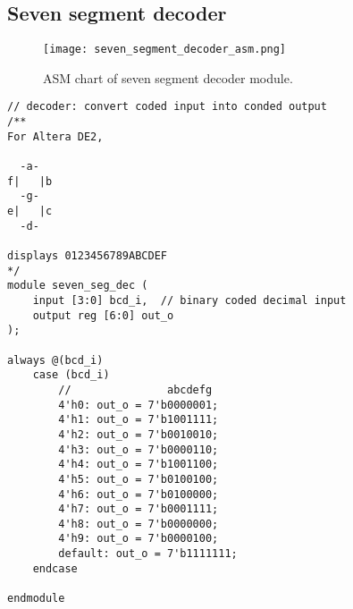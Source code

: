 \subsection{Seven segment decoder}

\begin{figure}[htbp]
   \centering
   \texttt{[image: seven\_segment\_decoder\_asm.png]}
   \caption{ASM chart of seven segment decoder module.}
   \label{fig:seven_segment_decoder_asm}
\end{figure}

\begin{verbatim}
// decoder: convert coded input into conded output
/**
For Altera DE2,

  -a-
f|   |b
  -g-
e|   |c
  -d-

displays 0123456789ABCDEF
*/
module seven_seg_dec (
	input [3:0] bcd_i,  // binary coded decimal input
	output reg [6:0] out_o
);

always @(bcd_i)
	case (bcd_i)
		//               abcdefg
		4'h0: out_o = 7'b0000001;
		4'h1: out_o = 7'b1001111;
		4'h2: out_o = 7'b0010010;
		4'h3: out_o = 7'b0000110;
		4'h4: out_o = 7'b1001100;
		4'h5: out_o = 7'b0100100;
		4'h6: out_o = 7'b0100000;
		4'h7: out_o = 7'b0001111;
		4'h8: out_o = 7'b0000000;
		4'h9: out_o = 7'b0000100;
		default: out_o = 7'b1111111;
	endcase

endmodule
\end{verbatim}
